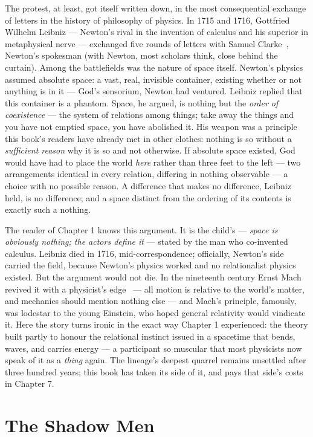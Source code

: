\documentclass[fontsize=11pt,paper=a4,pagesize=auto,parskip=half-]{scrbook}
\begin{document}
The protest, at least, got itself written down, in the most consequential exchange of letters in the history of philosophy of physics. In 1715 and 1716, Gottfried Wilhelm Leibniz --- Newton's rival in the invention of calculus and his superior in metaphysical nerve --- exchanged five rounds of letters with Samuel Clarke~\cite{leibnizclarke}, Newton's spokesman (with Newton, most scholars think, close behind the curtain). Among the battlefields was the nature of space itself. Newton's physics assumed absolute space: a vast, real, invisible container, existing whether or not anything is in it --- God's sensorium, Newton had ventured. Leibniz replied that this container is a phantom. Space, he argued, is nothing but the \emph{order of coexistence} --- the system of relations among things; take away the things and you have not emptied space, you have abolished it. His weapon was a principle this book's readers have already met in other clothes: nothing is so without a \emph{sufficient reason} why it is so and not otherwise. If absolute space existed, God would have had to place the world \emph{here} rather than three feet to the left --- two arrangements identical in every relation, differing in nothing observable --- a choice with no possible reason. A difference that makes no difference, Leibniz held, is no difference; and a space distinct from the ordering of its contents is exactly such a nothing.

The reader of Chapter 1 knows this argument. It is the child's --- \emph{space is obviously nothing; the actors define it} --- stated by the man who co-invented calculus. Leibniz died in 1716, mid-correspondence; officially, Newton's side carried the field, because Newton's physics worked and no relationalist physics existed. But the argument would not die. In the nineteenth century Ernst Mach revived it with a physicist's edge~\cite{mach1883} --- all motion is relative to the world's matter, and mechanics should mention nothing else --- and Mach's principle, famously, was lodestar to the young Einstein, who hoped general relativity would vindicate it. Here the story turns ironic in the exact way Chapter 1 experienced: the theory built partly to honour the relational instinct issued in a spacetime that bends, waves, and carries energy --- a participant so muscular that most physicists now speak of it as a \emph{thing} again. The lineage's deepest quarrel remains unsettled after three hundred years; this book has taken its side of it, and pays that side's costs in Chapter 7.

\section{The Shadow Men}
\end{document}
